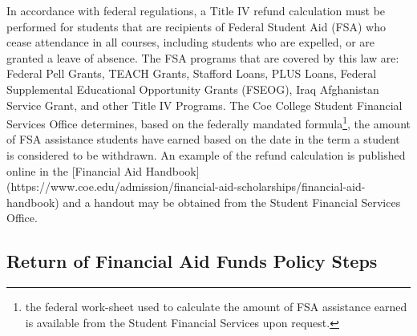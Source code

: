 \documentclass[
  letterpaper,
]{scrbook}
\begin{document}
In accordance with federal regulations, a Title IV refund calculation
must be performed for students that are recipients of Federal Student
Aid (FSA) who cease attendance in all courses, including students who
are expelled, or are granted a leave of absence. The FSA programs that
are covered by this law are: Federal Pell Grants, TEACH Grants, Stafford
Loans, PLUS Loans, Federal Supplemental Educational Opportunity Grants
(FSEOG), Iraq Afghanistan Service Grant, and other Title IV Programs.
The Coe College Student Financial Services Office determines, based on
the federally mandated formula\footnote{the federal work-sheet used to
  calculate the amount of FSA assistance earned is available from the
  Student Financial Services upon request.}, the amount of FSA
assistance students have earned based on the date in the term a student
is considered to be withdrawn. An example of the refund calculation is
published online in the {[}Financial Aid Handbook{]}
(https://www.coe.edu/admission/financial-aid-scholarships/financial-aid-handbook)
and a handout may be obtained from the Student Financial Services
Office.

\hypertarget{return-of-financial-aid-funds-policy-steps}{%
\subsection{Return of Financial Aid Funds Policy
Steps}\label{return-of-financial-aid-funds-policy-steps}}
\end{document}
